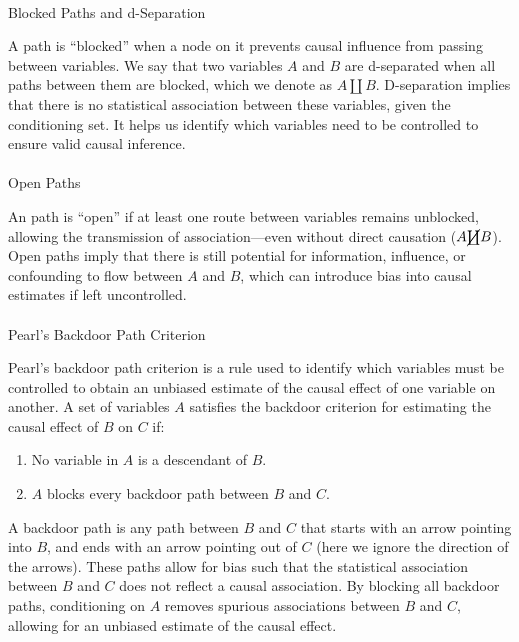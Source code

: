 \documentclass[
  singlecolumn]{article}
\makeatletter
\let\oldparagraph\paragraph
\renewcommand{\paragraph}{
    \@ifstar
      \xxxParagraphStar
      \xxxParagraphNoStar
  }
\newcommand{\xxxParagraphStar}[1]{\oldparagraph*{#1}\mbox{}}
\newcommand{\xxxParagraphNoStar}[1]{\oldparagraph{#1}\mbox{}}
\providecommand{\tightlist}{%
  \setlength{\itemsep}{0pt}\setlength{\parskip}{0pt}}\usepackage{longtable,booktabs,array}
\makeatother
\begin{document}
\paragraph{Blocked Paths and
d-Separation}\label{blocked-paths-and-d-separation}

A path is ``blocked'' when a node on it prevents causal influence from
passing between variables. We say that two variables \(A\) and \(B\) are
d-separated when all paths between them are blocked, which we denote as
\(A \coprod B\). D-separation implies that there is no statistical
association between these variables, given the conditioning set. It
helps us identify which variables need to be controlled to ensure valid
causal inference.

\paragraph{Open Paths}\label{open-paths}

An path is ``open'' if at least one route between variables remains
unblocked, allowing the transmission of association---even without
direct causation (\(A \cancel\coprod B\)). Open paths imply that there
is still potential for information, influence, or confounding to flow
between \(A\) and \(B\), which can introduce bias into causal estimates
if left uncontrolled.

\paragraph{Pearl's Backdoor Path
Criterion}\label{pearls-backdoor-path-criterion}

Pearl's backdoor path criterion is a rule used to identify which
variables must be controlled to obtain an unbiased estimate of the
causal effect of one variable on another. A set of variables \(A\)
satisfies the backdoor criterion for estimating the causal effect of
\(B\) on \(C\) if:

\begin{enumerate}
\def\labelenumi{(\arabic{enumi})}
\tightlist
\item
  No variable in \(A\) is a descendant of \(B\).
\item
  \(A\) blocks every backdoor path between \(B\) and \(C\).
\end{enumerate}

A backdoor path is any path between \(B\) and \(C\) that starts with an
arrow pointing into \(B\), and ends with an arrow pointing out of \(C\)
(here we ignore the direction of the arrows). These paths allow for bias
such that the statistical association between \(B\) and \(C\) does not
reflect a causal association. By blocking all backdoor paths,
conditioning on \(\boxed{A}\) removes spurious associations between
\(B\) and \(C\), allowing for an unbiased estimate of the causal effect.
\end{document}

